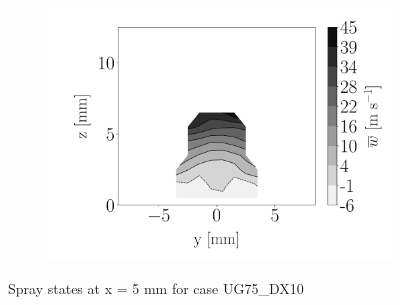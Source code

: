 \begin{figure}[h!]
\begin{subfigure}[b]{0.3\textwidth}
	\centering
   \includegraphics[scale=\scaleSLIJICF]{./part2_developments/figures_ch5_resolved_JICF/injectors_SLI/uG75_dx10_x05_uz_mean_map}
\end{subfigure}
\caption{Spray states at x = 5 mm for case UG75\_DX10}
\label{fig:injectors_sli_uG75_dx10_x05}
\end{figure}




